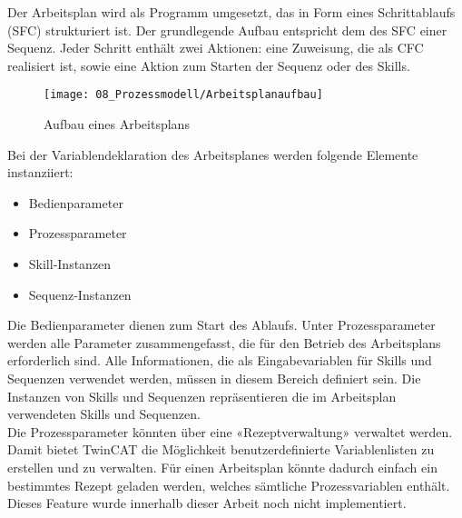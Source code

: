 		Der Arbeitsplan wird als Programm umgesetzt, das in Form eines Schrittablaufs (\Gls{SFC}) strukturiert ist. Der grundlegende Aufbau entspricht dem des \Gls{SFC} einer Sequenz. Jeder Schritt enthält zwei Aktionen: eine Zuweisung, die als \Gls{CFC} realisiert ist, sowie eine Aktion zum Starten der Sequenz oder des Skills.
		
		\begin{figure}[H]
			\centering
			\texttt{[image: 08\_Prozessmodell/Arbeitsplanaufbau]}
			\captionsetup{justification=centering}
			\caption{Aufbau eines Arbeitsplans}
			\label{fig:Arbeitsplanaufbau}
		\end{figure}
		
		Bei der Variablendeklaration des Arbeitsplanes werden folgende Elemente instanziiert: 
		
		\begin{itemize}
			\item Bedienparameter
			\item Prozessparameter
			\item Skill-Instanzen
			\item Sequenz-Instanzen
		\end{itemize}
		\vspace{2mm}
		Die Bedienparameter dienen zum Start des Ablaufs. Unter Prozessparameter werden alle Parameter zusammengefasst, die für den Betrieb des Arbeitsplans erforderlich sind. Alle Informationen, die als Eingabevariablen für Skills und Sequenzen verwendet werden, müssen in diesem Bereich definiert sein. Die Instanzen von Skills und Sequenzen repräsentieren die im Arbeitsplan verwendeten Skills und Sequenzen.
		\\
		Die Prozessparameter könnten über eine «Rezeptverwaltung» verwaltet werden. Damit bietet TwinCAT die Möglichkeit benutzerdefinierte Variablenlisten zu erstellen und zu verwalten. Für einen Arbeitsplan könnte dadurch einfach ein bestimmtes Rezept geladen werden, welches sämtliche Prozessvariablen enthält. Dieses Feature wurde innerhalb dieser Arbeit noch nicht implementiert. 
		
			